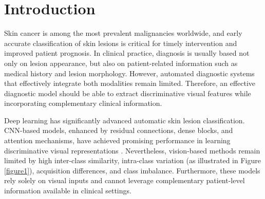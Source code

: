\documentclass[preprint,12pt]{elsarticle}
\makeatletter
\def@NAT@last@yr{--\NAT@penalty}%
\makeatother
\begin{document}


\section{Introduction}
Skin cancer is among the most prevalent malignancies worldwide, and early accurate classification of skin lesions is critical for timely intervention and improved patient prognosis. In clinical practice, diagnosis is usually based not only on lesion appearance, but also on patient-related information such as medical history and lesion morphology. However, automated diagnostic systems that effectively integrate both modalities remain limited. Therefore, an effective diagnostic model should be able to extract discriminative visual features while incorporating complementary clinical information.


Deep learning has significantly advanced automatic skin lesion classification. CNN-based models, enhanced by residual connections, dense blocks, and attention mechanisms, have achieved promising performance in learning discriminative visual representations \cite{yu2017melanoma,hosny2022refined,wu2020skin}. Nevertheless, vision-based methods remain limited by high inter-class similarity, intra-class variation (as illustrated in Figure \ref{figure1}), acquisition differences, and class imbalance. Furthermore, these models rely solely on visual inputs and cannot leverage complementary patient-level information available in clinical settings.
\end{document}

